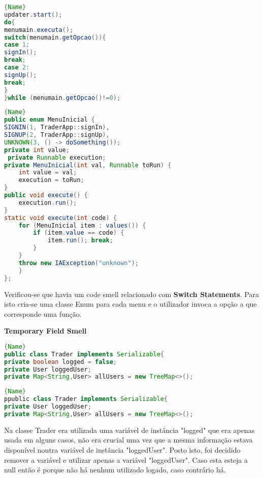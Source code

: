 \noindent\begin{minipage}{.45\textwidth}
\begin{lstlisting}[breaklines,caption=Original,frame=tlrb,language=java]{Name}
updater.start();
do{
menumain.executa();
switch(menumain.getOpcao()){
case 1:
signIn();
break;
case 2:
signUp();
break;
}
}while (menumain.getOpcao()!=0);
\end{lstlisting}
\end{minipage}\hfill
\begin{minipage}{.45\textwidth}
\begin{lstlisting}[breaklines,caption=Refactored,frame=tlrb,language=java]{Name}
public enum MenuInicial {
SIGNIN(1, TraderApp::signIn),
SIGNUP(2, TraderApp::signUp),
UNKNOWN(3, () -> doSomething());
private int value;
 private Runnable execution;
private MenuInicial(int val, Runnable toRun) {
    int value = val;
    execution = toRun;
}
public void execute() { 
    execution.run();
}
static void execute(int code) {
    for (MenuInicial item : values()) {
        if (item.value == code) {
            item.run(); break;
        }
    }
    throw new IAException("unknown");
    }
};
\end{lstlisting}
\end{minipage}

Verificou-se que havia um code smell relacionado com \textbf{Switch Statements}. Para isto cria-se uma classe Enum para cada menu e o utilizador invoca a opção a que corresponde uma função.

\newpage
\textbf{Temporary Field Smell}

\noindent\begin{minipage}{.45\textwidth}
\begin{lstlisting}[breaklines,caption=Original,frame=tlrb,language=java]{Name}
public class Trader implements Serializable{
private boolean logged = false;
private User loggedUser;
private Map<String,User> allUsers = new TreeMap<>();
\end{lstlisting}
\end{minipage}\hfill
\begin{minipage}{.45\textwidth}
\begin{lstlisting}[breaklines,caption=Refactored,frame=tlrb,language=java]{Name}
ppublic class Trader implements Serializable{
private User loggedUser;
private Map<String,User> allUsers = new TreeMap<>();
\end{lstlisting}
\end{minipage}

Na classe Trader era utilizada uma variável de instância "logged" que era apenas usada em alguns casos, não era crucial uma vez que a mesma informação estava disponível noutra variável de instância "loggedUser". Posto isto, foi decidido remover a variável e utilizar apenas a variável "loggedUser". Caso esta esteja a null então é porque não há nenhum utilizado logado, caso contrário há.

